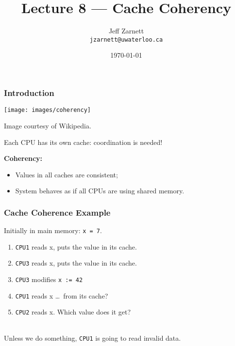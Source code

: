 

\title{Lecture 8 --- Cache Coherency }

\author{Jeff Zarnett \\ \small \texttt{jzarnett@uwaterloo.ca}}
\date{\today}




\begin{frame}
  \titlepage

 \end{frame}

\begin{frame}
  \frametitle{Introduction}

  \begin{center}
    \texttt{[image: images/coherency]}

    Image courtesy of Wikipedia.
  \end{center}

Each CPU has its own cache: coordination is needed!
  
  {\bf Coherency:}
  \begin{itemize}
    \item Values in all caches are consistent;
    \item System behaves as if all CPUs are using shared memory.
  \end{itemize}
  
\end{frame}

\begin{frame}
  \frametitle{Cache Coherence Example}

  
  Initially in main memory: {\tt x = 7}.

  \begin{enumerate}
    \item {\tt CPU1} reads x, puts the value in its cache.
    \item {\tt CPU3} reads x, puts the value in its cache.
    \item {\tt CPU3} modifies {\tt x := 42}
    \item {\tt CPU1} reads x \ldots ~from its cache?
    \item {\tt CPU2} reads x. Which value does it get?
  \end{enumerate}
  ~\\

  Unless we do something, {\tt CPU1} is going to read invalid data.
  
\end{frame}



